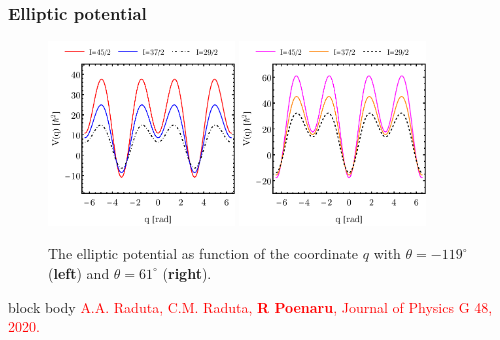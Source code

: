 \documentclass{beamer}
\begin{document}
\begin{frame}
	\frametitle{Elliptic potential}
	\begin{figure}
		\centering
		\includegraphics[width=0.44\textwidth]{figures/new-boson/potential-fit-theta.pdf}
		\includegraphics[width=0.44\textwidth]{figures/new-boson/potential-fit-theta-pi.pdf}
		\caption{The elliptic potential as function of the coordinate $q$ with $\theta=-119^\circ$ (\textbf{left}) and $\theta=61^\circ$ (\textbf{right}).}
	\end{figure}
	\begin{beamercolorbox}[rounded=true,shadow=false, wd=\linewidth,]{block body}
		\centering
		\textcolor{red}{\footnotesize{A.A. Raduta, C.M. Raduta, \textbf{R Poenaru}, Journal of Physics G 48, 2020.}}
	\end{beamercolorbox}
\end{frame}
\end{document}
